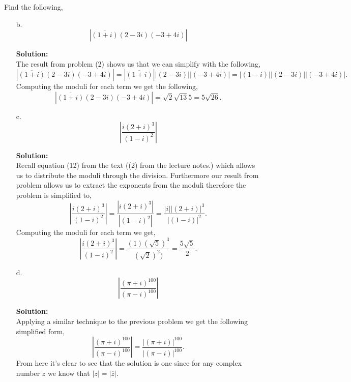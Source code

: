 \documentclass[12pt]{article}
\makeatletter
\theoremstyle{homework}
\newenvironment{exercise}[1]
{\def\@currentlabel{#1}\exercisecore}
{\endexercisecore}
\newcommand{\localhead}[1]{\par\smallskip\noindent\textbf{#1}\nobreak\\}%
\newcommand\solution{\localhead{Solution:}}
\makeatother
\begin{document}
\begin{exercise}{5} Find the following, \\
    \begin{enumerate}
        \item[b.] 
        \begin{equation*}
            |\overline{(1 + i)}(2 - 3i)(-3 + 4i)|
        \end{equation*} 
        \solution The result from problem (2) shows us that we can simplify with the following, 
        \begin{equation*}
            |\overline{(1 + i)}(2 - 3i)(-3 + 4i)| = |\overline{(1 + i)}||(2 - 3i)||(-3 + 4i)| = |(1 - i)||(2 - 3i)||(-3 + 4i)|.
        \end{equation*}
        Computing the moduli for each term we get the following, 
        \begin{equation*}
            |\overline{(1 + i)}(2 - 3i)(-3 + 4i)| = \sqrt{2}\sqrt{13}5 = 5\sqrt{26}.
        \end{equation*} 
        \vspace{.15in}
        \item[c.]
        \begin{equation*}
            \left|\dfrac{i(2 + i)^3}{(1 - i)^2}\right|
        \end{equation*}
        \solution Recall equation (12) from the text ((2) from the lecture notes.) which allows us to distribute the moduli through the division. Furthermore our result from problem allows us 
        to extract the exponents from the moduli therefore the problem is simplified to, 
        \begin{equation*}
            \left|\dfrac{i(2 + i)^3}{(1 - i)^2}\right| = \dfrac{|i(2 + i)^3|}{|(1 - i)^2|} = \dfrac{|i||(2 + i)|^3}{|(1 - i)|^2}. 
        \end{equation*}
        Computing the moduli for each term we get, 
        \begin{equation*}
            \left|\dfrac{i(2 + i)^3}{(1 - i)^2}\right| = \dfrac{(1)(\sqrt{5})^3}{(\sqrt{2})^2)} = \dfrac{5\sqrt{5}}{2}.
        \end{equation*}
        \item[d.] 
        \begin{equation*}
            \left|\dfrac{(\pi + i)^{100}}{(\pi - i)^{100}}\right|
        \end{equation*}  
        \solution Applying a similar technique to the previous problem we get the following simplified form, 
        \begin{equation*}
            \left|\dfrac{(\pi + i)^{100}}{(\pi - i)^{100}}\right| = \dfrac{|(\pi + i)|^{100}}{|(\pi - i)|^{100}}. 
        \end{equation*}
        From here it's clear to see that the solution is one since for any complex number $z$ we know that $|z| = |\overline{z}|$. 
    \end{enumerate}
\end{exercise}
\vspace{.15in}
\end{document}
